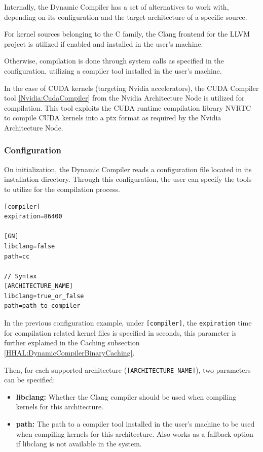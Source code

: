 Internally, the Dynamic Compiler has a set of alternatives to work with, depending on its configuration and the target architecture of a specific source.

For kernel sources belonging to the C family, the Clang frontend for the LLVM project \cite{clang_llvm} is utilized if enabled and installed in the user's machine.

Otherwise, compilation is done through system calls as specified in the configuration, utilizing a compiler tool installed in the user's machine.

In the case of CUDA kernels (targeting Nvidia accelerators), the CUDA Compiler tool \ref{Nvidia:CudaCompiler} from the Nvidia Architecture Node is utilized for compilation. This tool exploits the CUDA runtime compilation library NVRTC to compile CUDA kernels into a ptx format as required by the Nvidia Architecture Node.

\subsubsection{Configuration} \label{HHAL:DynamicCompilerConfiguration}

On initialization, the Dynamic Compiler reads a configuration file located in its installation directory. Through this configuration, the user can specify the tools to utilize for the compilation process.

\begin{lstlisting}[style=CStyle, caption=HHAL Dynamic Compiler - Configuration example]
[compiler]
expiration=86400

[GN]
libclang=false
path=cc

// Syntax
[ARCHITECTURE_NAME]
libclang=true_or_false
path=path_to_compiler
\end{lstlisting}

In the previous configuration example, under \texttt{[compiler]}, the \texttt{expiration} time for compilation related kernel files is specified in seconds, this parameter is further explained in the Caching subsection \ref{HHAL:DynamicCompilerBinaryCaching}.

Then, for each supported architecture (\texttt{[ARCHITECTURE\_NAME]}), two parameters can be specified:
\begin{itemize}
    \item \textbf{libclang:} Whether the Clang compiler should be used when compiling kernels for this architecture.
    \item \textbf{path:} The path to a compiler tool installed in the user's machine to be used when compiling kernels for this architecture. Also works as a fallback option if libclang is not available in the system.
\end{itemize}

